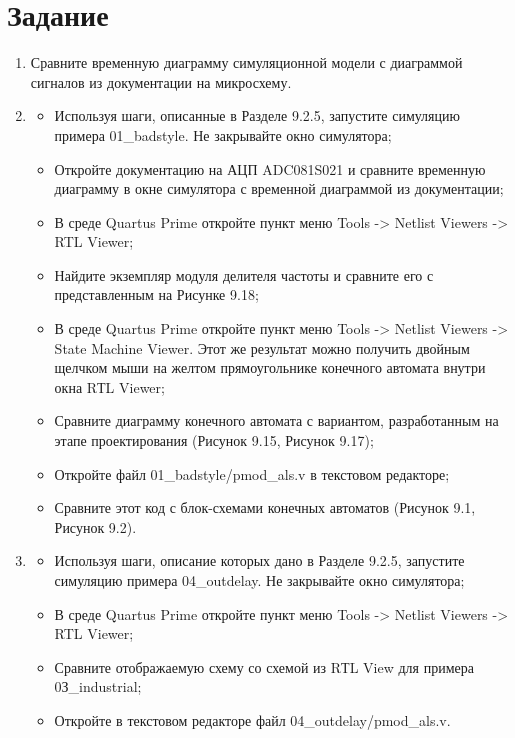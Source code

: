 \documentclass[a4paper,14pt]{article}
\begin{document}
	
	\tableofcontents
	\pagebreak
	\section{Задание}
	
	\begin{enumerate}
		\item Сравните временную диаграмму симуляционной модели с диаграммой сигналов из документации на микросхему.
		\item 
		\begin{itemize}
			\item Используя шаги, описанные в Разделе 9.2.5, запустите симуляцию примера 01\_badstyle. Не закрывайте окно симулятора;
			\item Откройте документацию на АЦП ADC081S021 и сравните временную диаграмму в окне симулятора с временной диаграммой из документации;
			\item В среде Quartus Prime откройте пункт меню Tools -> Netlist Viewers -> RTL Viewer;
			\item Найдите экземпляр модуля делителя частоты и сравните его с представленным на Рисунке 9.18;
			\item В среде Quartus Prime откройте пункт меню Tools -> Netlist Viewers -> State Machine	Viewer. Этот же результат можно получить двойным щелчком мыши на желтом прямоугольнике конечного автомата внутри окна RТL Viewer;
			\item Сравните диаграмму конечного автомата с вариантом, разработанным на этапе	проектирования (Рисунок 9.15, Рисунок 9.17);
			\item Откройте файл 01\_badstyle/pmod\_als.v в текстовом редакторе;
			\item Сравните этот код с блок-схемами конечных автоматов (Рисунок 9.1, Рисунок 9.2).
		\end{itemize}
	
	
		\item 
		\begin{itemize}
			\item Используя шаги, описание которых дано в Разделе 9.2.5, запустите симуляцию примера 04\_outdelay. Не закрывайте окно симулятора;
			\item В среде Quartus Prime откройте пункт меню Tools -> Netlist Viewers -> RTL Viewer;
			\item Сравните отображаемую схему со схемой из RТL View для примера 0З\_industrial;
			\item Откройте в текстовом редакторе файл 04\_outdelay/pmod\_als.v.
		\end{itemize}


\end{enumerate}
\end{document}
